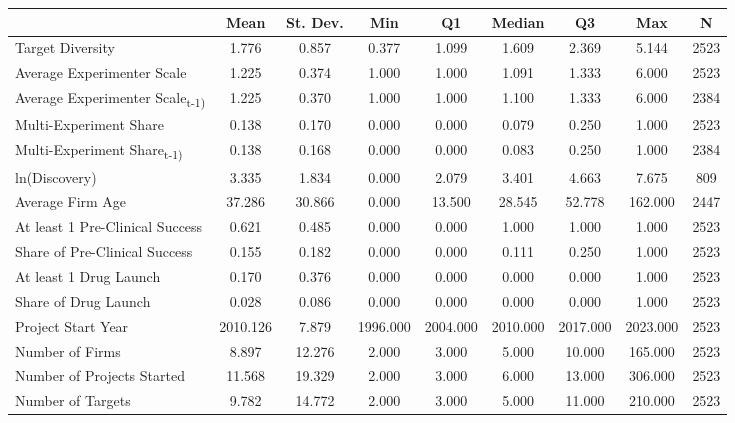 {
\def\sym#1{\ifmmode^{#1}\else\(^{#1}\)\fi}
\begin{tabular}{l*{1}{cccccccc}}
\hline\hline
                    &        Mean&    St. Dev.&         Min&          Q1&      Median&          Q3&         Max&           N\\
\hline
Target Diversity    &       1.776&       0.857&       0.377&       1.099&       1.609&       2.369&       5.144&        2523\\
Average Experimenter Scale&       1.225&       0.374&       1.000&       1.000&       1.091&       1.333&       6.000&        2523\\
Average Experimenter Scale\textsubscript{t-1)}&       1.225&       0.370&       1.000&       1.000&       1.100&       1.333&       6.000&        2384\\
Multi-Experiment Share&       0.138&       0.170&       0.000&       0.000&       0.079&       0.250&       1.000&        2523\\
Multi-Experiment Share\textsubscript{t-1)}&       0.138&       0.168&       0.000&       0.000&       0.083&       0.250&       1.000&        2384\\
ln(Discovery)       &       3.335&       1.834&       0.000&       2.079&       3.401&       4.663&       7.675&         809\\
Average Firm Age    &      37.286&      30.866&       0.000&      13.500&      28.545&      52.778&     162.000&        2447\\
At least 1 Pre-Clinical Success&       0.621&       0.485&       0.000&       0.000&       1.000&       1.000&       1.000&        2523\\
Share of Pre-Clinical Success&       0.155&       0.182&       0.000&       0.000&       0.111&       0.250&       1.000&        2523\\
At least 1 Drug Launch&       0.170&       0.376&       0.000&       0.000&       0.000&       0.000&       1.000&        2523\\
Share of Drug Launch&       0.028&       0.086&       0.000&       0.000&       0.000&       0.000&       1.000&        2523\\
Project Start Year  &    2010.126&       7.879&    1996.000&    2004.000&    2010.000&    2017.000&    2023.000&        2523\\
Number of Firms     &       8.897&      12.276&       2.000&       3.000&       5.000&      10.000&     165.000&        2523\\
Number of Projects Started&      11.568&      19.329&       2.000&       3.000&       6.000&      13.000&     306.000&        2523\\
Number of Targets   &       9.782&      14.772&       2.000&       3.000&       5.000&      11.000&     210.000&        2523\\
\hline\hline
\end{tabular}
}
